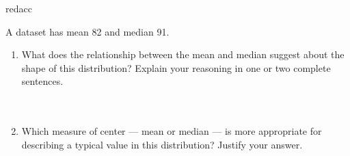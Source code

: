 \documentclass[10pt]{article}
\begin{document}
\begin{blurbbox}{redacc}
\small

A dataset has mean 82 and median 91.

\begin{enumerate}[leftmargin=1.5em, itemsep=8pt]

  \item What does the relationship between the mean and median suggest about
        the shape of this distribution? Explain your reasoning in one or two
        complete sentences.\\[5pt]
        \writeline\\[1pt]\writeline\\[1pt]\writeline

  \item Which measure of center --- mean or median --- is more appropriate for
        describing a typical value in this distribution? Justify your answer.\\[5pt]
        \writeline\\[1pt]\writeline

\end{enumerate}

\end{blurbbox}
\end{document}
